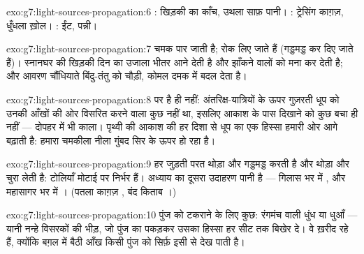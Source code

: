 \begin{solution}{exo:g7:light-sources-propagation:6}
: खिड़की का काँच, उथला साफ़ पानी। : ट्रेसिंग काग़ज़,
धुँधला ख़ोल। : ईंट, पन्नी।
\end{solution}

\begin{solution}{exo:g7:light-sources-propagation:7}
चमक पार जाती है;  रोक लिए जाते हैं (गड्डमड्ड कर दिए जाते
हैं)। स्नानघर की खिड़की दिन का उजाला भीतर आने देती है और झाँकने वालों
को मना कर देती है; और आवरण चौंधियाते बिंदु-तंतु को चौड़ी, कोमल दमक में
बदल देता है।
\end{solution}

\begin{solution}{exo:g7:light-sources-propagation:8}
 पर  है ही नहीं: अंतरिक्ष-यात्रियों के ऊपर गुज़रती धूप को
उनकी आँखों की ओर विसरित करने वाला कुछ नहीं था, इसलिए आकाश के पास दिखाने
को कुछ बचा ही नहीं --- दोपहर में भी काला। पृथ्वी की  आकाश की हर
दिशा से धूप का एक हिस्सा हमारी ओर आगे बढ़ाती है: हमारा चमकीला नीला
गुंबद सिर के ऊपर हो रहा  है।
\end{solution}

\begin{solution}{exo:g7:light-sources-propagation:9}
हर जुड़ती परत थोड़ा और गड्डमड्ड करती है और थोड़ा और चुरा लेती है:
टोलियाँ मोटाई पर निर्भर हैं। अध्याय का दूसरा उदाहरण पानी है ---
गिलास भर में , और महासागर भर में । (पतला काग़ज़
, बंद किताब ।)
\end{solution}

\begin{solution}{exo:g7:light-sources-propagation:10}
पुंज को टकराने के लिए कुछ: रंगमंच वाली धुंध या धुआँ --- यानी नन्हे
विसरकों की भीड़, जो पुंज का  पकड़कर उसका हिस्सा हर सीट तक बिखेर
दे। वे  ख़रीद रहे हैं, क्योंकि बग़ल में बैठी आँख किसी पुंज को
सिर्फ़ इसी से देख पाती है।
\end{solution}

